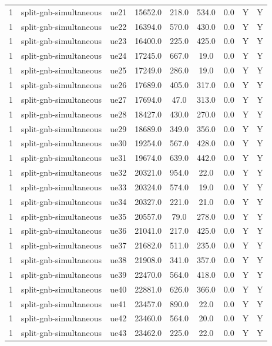 \begin{table}[ht]
\begin{tabular}{|c|c|c|c|c|c|c|c|c|}
1 & split-gnb-simultaneous & ue21 & 15652.0 & 218.0 & 534.0 & 0.0 & Y & Y \\
1 & split-gnb-simultaneous & ue22 & 16394.0 & 570.0 & 430.0 & 0.0 & Y & Y \\
1 & split-gnb-simultaneous & ue23 & 16400.0 & 225.0 & 425.0 & 0.0 & Y & Y \\
1 & split-gnb-simultaneous & ue24 & 17245.0 & 667.0 & 19.0 & 0.0 & Y & Y \\
1 & split-gnb-simultaneous & ue25 & 17249.0 & 286.0 & 19.0 & 0.0 & Y & Y \\
1 & split-gnb-simultaneous & ue26 & 17689.0 & 405.0 & 317.0 & 0.0 & Y & Y \\
1 & split-gnb-simultaneous & ue27 & 17694.0 & 47.0 & 313.0 & 0.0 & Y & Y \\
1 & split-gnb-simultaneous & ue28 & 18427.0 & 430.0 & 270.0 & 0.0 & Y & Y \\
1 & split-gnb-simultaneous & ue29 & 18689.0 & 349.0 & 356.0 & 0.0 & Y & Y \\
1 & split-gnb-simultaneous & ue30 & 19254.0 & 567.0 & 428.0 & 0.0 & Y & Y \\
1 & split-gnb-simultaneous & ue31 & 19674.0 & 639.0 & 442.0 & 0.0 & Y & Y \\
1 & split-gnb-simultaneous & ue32 & 20321.0 & 954.0 & 22.0 & 0.0 & Y & Y \\
1 & split-gnb-simultaneous & ue33 & 20324.0 & 574.0 & 19.0 & 0.0 & Y & Y \\
1 & split-gnb-simultaneous & ue34 & 20327.0 & 221.0 & 21.0 & 0.0 & Y & Y \\
1 & split-gnb-simultaneous & ue35 & 20557.0 & 79.0 & 278.0 & 0.0 & Y & Y \\
1 & split-gnb-simultaneous & ue36 & 21041.0 & 217.0 & 425.0 & 0.0 & Y & Y \\
1 & split-gnb-simultaneous & ue37 & 21682.0 & 511.0 & 235.0 & 0.0 & Y & Y \\
1 & split-gnb-simultaneous & ue38 & 21908.0 & 341.0 & 357.0 & 0.0 & Y & Y \\
1 & split-gnb-simultaneous & ue39 & 22470.0 & 564.0 & 418.0 & 0.0 & Y & Y \\
1 & split-gnb-simultaneous & ue40 & 22881.0 & 626.0 & 366.0 & 0.0 & Y & Y \\
1 & split-gnb-simultaneous & ue41 & 23457.0 & 890.0 & 22.0 & 0.0 & Y & Y \\
1 & split-gnb-simultaneous & ue42 & 23460.0 & 564.0 & 20.0 & 0.0 & Y & Y \\
1 & split-gnb-simultaneous & ue43 & 23462.0 & 225.0 & 22.0 & 0.0 & Y & Y \\

\end{tabular}
\end{table}
